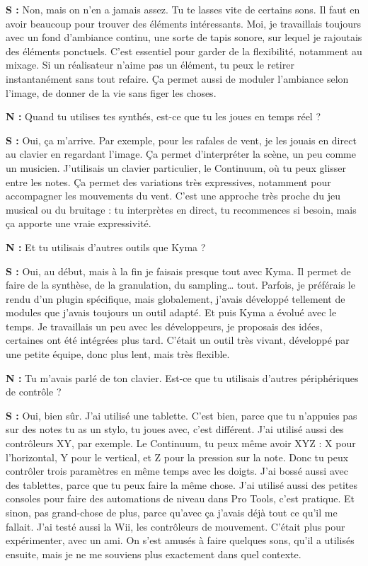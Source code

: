 ﻿\documentclass[12pt]{article}
\begin{document}
\textbf{S :} Non, mais on n’en a jamais assez. Tu te lasses vite de certains sons. Il faut en avoir beaucoup pour trouver des éléments intéressants.
Moi, je travaillais toujours avec un fond d’ambiance continu, une sorte de tapis sonore, sur lequel je rajoutais des éléments ponctuels. C’est essentiel pour garder de la flexibilité, notamment au mixage. Si un réalisateur n’aime pas un élément, tu peux le retirer instantanément sans tout refaire.
Ça permet aussi de moduler l’ambiance selon l’image, de donner de la vie sans figer les choses.

\textbf{N :} Quand tu utilises tes synthés, est-ce que tu les joues en temps réel ?

\textbf{S :} Oui, ça m’arrive. Par exemple, pour les rafales de vent, je les jouais en direct au clavier en regardant l’image. Ça permet d’interpréter la scène, un peu comme un musicien.
J’utilisais un clavier particulier, le Continuum, où tu peux glisser entre les notes. Ça permet des variations très expressives, notamment pour accompagner les mouvements du vent.
C’est une approche très proche du jeu musical ou du bruitage : tu interprètes en direct, tu recommences si besoin, mais ça apporte une vraie expressivité.

\textbf{N :} Et tu utilisais d’autres outils que Kyma ?

\textbf{S :} Oui, au début, mais à la fin je faisais presque tout avec Kyma. Il permet de faire de la synthèse, de la granulation, du sampling… tout.
Parfois, je préférais le rendu d’un plugin spécifique, mais globalement, j’avais développé tellement de modules que j’avais toujours un outil adapté.
Et puis Kyma a évolué avec le temps. Je travaillais un peu avec les développeurs, je proposais des idées, certaines ont été intégrées plus tard. C’était un outil très vivant, développé par une petite équipe, donc plus lent, mais très flexible.

\textbf{N :} Tu m'avais parlé de ton clavier. Est-ce que tu utilisais d'autres périphériques de contrôle ?

\textbf{S :} Oui, bien sûr. J'ai utilisé une tablette. C'est bien, parce que tu n'appuies pas sur des notes tu as un stylo, tu joues avec, c'est différent. J'ai utilisé aussi des contrôleurs XY, par exemple.
 Le Continuum, tu peux même avoir XYZ : X pour l’horizontal, Y pour le vertical, et Z pour la pression sur la note. Donc tu peux contrôler trois paramètres en même temps avec les doigts. J’ai bossé aussi avec des tablettes, parce que tu peux faire la même chose.
J’ai utilisé aussi des petites consoles pour faire des automations de niveau dans Pro Tools, c’est pratique. Et sinon, pas grand-chose de plus, parce qu’avec ça j’avais déjà tout ce qu’il me fallait.
J’ai testé aussi la Wii, les contrôleurs de mouvement. C’était plus pour expérimenter, avec un ami. On s’est amusés à faire quelques sons, qu’il a utilisés ensuite, mais je ne me souviens plus exactement dans quel contexte.
\end{document}
